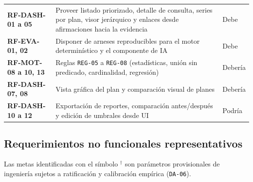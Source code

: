 \documentclass[12pt,a4paper]{article}
\newcommand{\dagsym}{\ensuremath{^{\dagger}}}
\begin{document}
\begin{longtable}{>{\bfseries}p{} p{} p{}}
RF-DASH-01 a 05 & Proveer listado priorizado, detalle de consulta, series por plan, visor jerárquico y enlaces desde afirmaciones hacia la evidencia & Debe \\
RF-EVA-01, 02 & Disponer de arneses reproducibles para el motor determinístico y el componente de IA & Debe \\
RF-MOT-08 a 10, 13 & Reglas \texttt{REG-05} a \texttt{REG-08} (estadísticas, unión sin predicado, cardinalidad, regresión) & Debería \\
RF-DASH-07, 08 & Vista gráfica del plan y comparación visual de planes & Debería \\
RF-DASH-10 a 12 & Exportación de reportes, comparación antes/después y edición de umbrales desde UI & Podría \\
\end{longtable}
\endgroup

\subsection{Requerimientos no funcionales representativos}

Las metas identificadas con el símbolo \dagsym{} son parámetros provisionales de ingeniería sujetos a ratificación y calibración empírica (\texttt{DA-06}).
\end{document}

